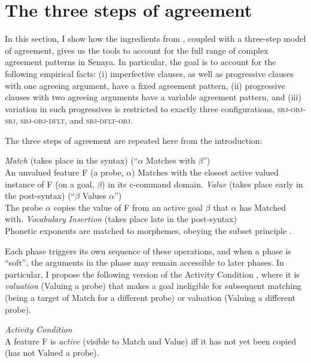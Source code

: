 \documentclass[output=paper
,modfonts
,nonflat]{langsci/langscibook}
\begin{document}
\section{The three steps of agreement} \label{sec-kalin:4}

In this section, I show how the ingredients from , coupled with  a three-step model of agreement, gives us the tools to account for the full range of complex agreement patterns in Senaya. In particular, the goal is to account for the following empirical facts: (i) imperfective clauses, as well as progressive clauses with one agreeing argument, have a fixed agreement pattern, (ii) progressive clauses with two agreeing arguments have a variable agreement pattern, and (iii) variation in such progressives is restricted to exactly three configurations, \textsc{sbj-obj-sbj}, \textsc{sbj-obj-dflt}, and \textsc{sbj-dflt-obj}. 

The three steps of agreement are repeated here from the introduction:

\eal \label{OPS2}
\ex \textit{Match} {(takes place in the syntax)} \- \hfill (``{$\alpha$} Matches with {$\beta$}'')\\
An unvalued feature F (a probe, {$\alpha$}) Matches with the closest active valued instance of F (on a goal, {$\beta$}) in its c-command domain.
\ex \textit{Value} (takes place early in the post-syntax) \- \hfill (``{$\beta$} Values {$\alpha$}'')\\
The probe {$\alpha$} copies the value of F from an active goal {$\beta$} that {$\alpha$} has Matched with.
\ex \textit{Vocabulary Insertion} (takes place late in the post-syntax)\\
Phonetic exponents are matched to morphemes, obeying the subset principle \citep{Halle97}.
\zl

\noindent Each phase triggers its own sequence of these operations, and when a phase is ``soft'', the arguments in the phase may remain accessible to later phases. In particular, I propose the following version of the Activity Condition \citep{Chomsky01}, where it is \textit{valuation} (Valuing a probe) that makes a goal ineligible for subsequent matching (being a target of Match for a different probe) or valuation (Valuing a different probe).

\ea \textit{Activity Condition}\\A feature F is \textit{active} (visible to Match and Value) iff it has not yet been copied (has not Valued a probe).\label{AC2}
\z
\end{document}
